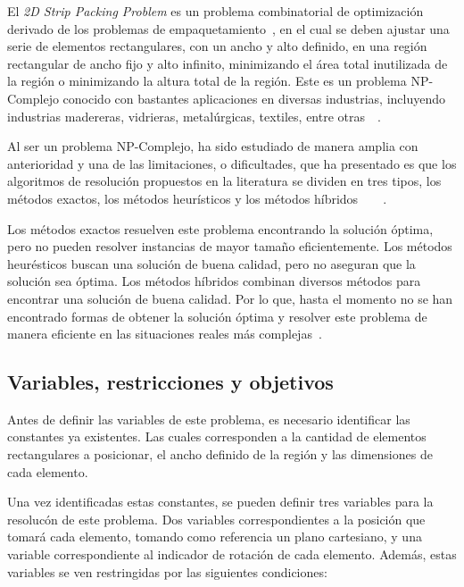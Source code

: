\documentclass[letter, 10pt]{article}
\begin{document}
El \emph{2D Strip Packing Problem} es un problema combinatorial de optimizaci\'on derivado de los problemas de empaquetamiento~\cite{oliveira2016survey}, en el cual se deben ajustar una serie de elementos rectangulares, con un ancho y alto definido, en una regi\'on rectangular de ancho fijo y alto infinito, minimizando el \'area total inutilizada de la regi\'on o minimizando la altura total de la regi\'on. Este es un problema NP-Complejo conocido con bastantes aplicaciones en diversas industrias, incluyendo industrias madereras, vidrieras, metal\'urgicas, textiles, entre otras~\cite{lodi2002two}~\cite{vasilyev2023generalized}.

Al ser un problema NP-Complejo, ha sido estudiado de manera amplia con anterioridad y una de las limitaciones, o dificultades, que ha presentado es que los algoritmos de resoluci\'on propuestos en la literatura se dividen en tres tipos, los m\'etodos exactos, los m\'etodos heur\'isticos y los m\'etodos h\'ibridos~\cite{he2013heuristics}~\cite{junior2023framework}~\cite{oliveira2016survey}~\cite{wei2017improved}.

Los m\'etodos exactos resuelven este problema encontrando la soluci\'on \'optima, pero no pueden resolver instancias de mayor tama\~no eficientemente. Los m\'etodos heur\'esticos buscan una soluci\'on de buena calidad, pero no aseguran que la soluci\'on sea \'optima. Los m\'etodos h\'ibridos combinan diversos m\'etodos para encontrar una soluci\'on de buena calidad. Por lo que, hasta el momento no se han encontrado formas de obtener la soluci\'on \'optima y resolver este problema de manera eficiente en las situaciones reales m\'as complejas~\cite{thomas2013hybrid}.

\subsection{Variables, restricciones y objetivos}

Antes de definir las variables de este problema, es necesario identificar las constantes ya existentes. Las cuales corresponden a la cantidad de elementos rectangulares a posicionar, el ancho definido de la regi\'on y las dimensiones de cada elemento.

Una vez identificadas estas constantes, se pueden definir tres variables para la resoluc\'on de este problema. Dos variables correspondientes a la posici\'on que tomar\'a cada elemento, tomando como referencia un plano cartesiano, y una variable correspondiente al indicador de rotaci\'on de cada elemento. Adem\'as, estas variables se ven restringidas por las siguientes condiciones:
\end{document}
